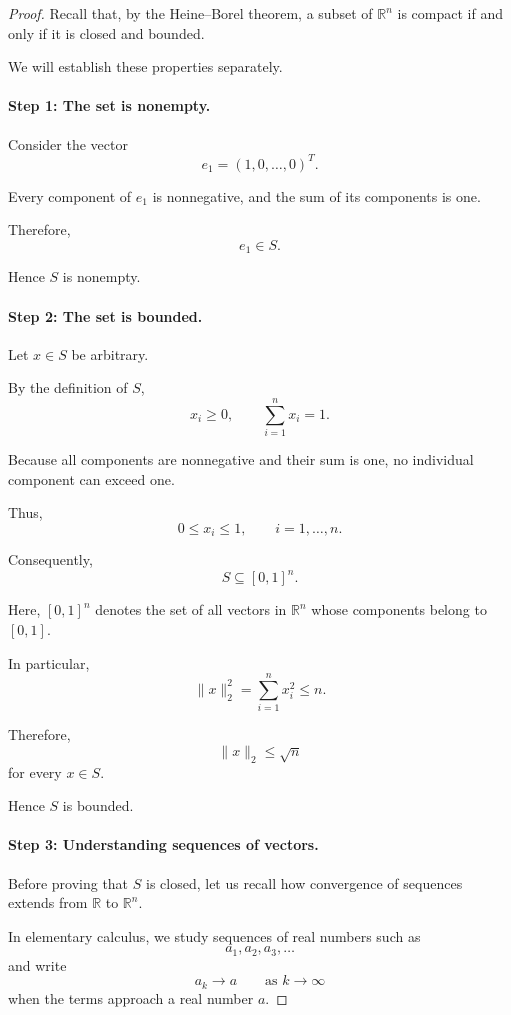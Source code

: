 \documentclass[11pt,a4paper]{article}
\theoremstyle{definition}
\theoremstyle{remark}
\begin{document}
\begin{proof}

Recall that, by the Heine--Borel theorem,
a subset of $\mathbb{R}^n$ is compact
if and only if it is closed and bounded.

We will establish these properties
separately.

\paragraph{Step 1: The set is nonempty.}

Consider the vector
\[
e_1=(1,0,\ldots,0)^T.
\]

Every component of $e_1$ is nonnegative,
and the sum of its components is one.

Therefore,
\[
e_1\in S.
\]

Hence $S$ is nonempty.


\paragraph{Step 2: The set is bounded.}

Let $x\in S$ be arbitrary.

By the definition of $S$,
\[
x_i\geq0,
\qquad
\sum_{i=1}^{n}x_i=1.
\]

Because all components are nonnegative
and their sum is one, no individual
component can exceed one.

Thus,
\[
0\leq x_i\leq1,
\qquad i=1,\ldots,n.
\]

Consequently,
\[
S\subseteq[0,1]^n.
\]

Here, $[0,1]^n$ denotes the set
of all vectors in $\mathbb{R}^n$
whose components belong to $[0,1]$.

In particular,
\[
\|x\|_2^2
=
\sum_{i=1}^{n}x_i^2
\leq n.
\]

Therefore,
\[
\|x\|_2\leq\sqrt{n}
\]
for every $x\in S$.

Hence $S$ is bounded.


\paragraph{Step 3: Understanding sequences
of vectors.}

Before proving that $S$ is closed,
let us recall how convergence of
sequences extends from $\mathbb{R}$
to $\mathbb{R}^n$.

In elementary calculus, we study
sequences of real numbers such as
\[
a_1,a_2,a_3,\ldots
\]
and write
\[
a_k\longrightarrow a
\qquad\text{as }k\to\infty
\]
when the terms approach a real
number $a$.


\end{proof}
\end{document}
